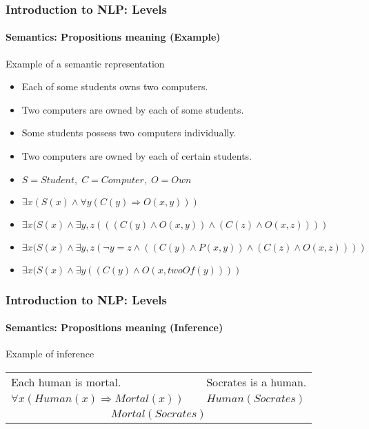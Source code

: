 \documentclass[xcolor=table]{beamer}
\begin{document}
\begin{frame}
\frametitle{Introduction to NLP: Levels}
\framesubtitle{Semantics: Propositions meaning (Example)}

\begin{exampleblock}{Example of a semantic representation}
	\begin{itemize}
		\item Each of some students owns two computers.
		\item Two computers are owned by each of some students.
		\item Some students possess two computers individually.
		\item Two computers are owned by each of certain students.
		\item $S = Student, \; C = Computer, \; O = Own$
		\item $\exists x (S(x) \wedge \forall y ( C(y) \Rightarrow O(x, y)) )$ \textcolor{red}{\XBox}
		\item $\exists x (S(x) \wedge \exists y, z (( (C(y) \wedge O(x, y) ) \wedge (C(z) \wedge O(x, z) ) ))$ \textcolor{red}{\XBox}
		\item $\exists x (S(x) \wedge \exists y, z (\neg y = z \wedge ( (C(y) \wedge P(x, y) ) \wedge (C(z) \wedge O(x, z) ) ))$ \textcolor{green}{\CheckedBox}
		\item $\exists x (S(x) \wedge \exists y ((C(y) \wedge O(x, twoOf(y)) ))$ \textcolor{green}{\CheckedBox}
	\end{itemize}
\end{exampleblock}

\end{frame}

\begin{frame}
\frametitle{Introduction to NLP: Levels}
\framesubtitle{Semantics: Propositions meaning (Inference)}

\begin{exampleblock}{Example of inference}
	\centering
	\begin{tabular}{lll}
		Each human is mortal.  & & Socrates is a human. \\
		$\forall x (Human(x) \Rightarrow Mortal(x))$ && $Human(Socrates)$ \\
		\hline
		\multicolumn{3}{c}{$Mortal(Socrates)$}\\
	\end{tabular}
	
\end{exampleblock}

\end{frame}
\end{document}
